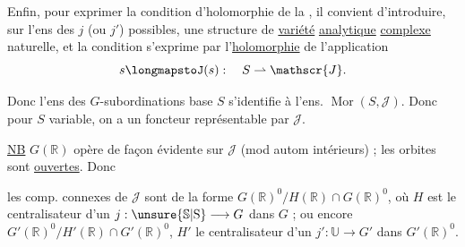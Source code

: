 Enfin, pour exprimer la condition d'holomorphie de la , il convient d'introduire,  sur l'ens  des $j$ (ou $j'$) possibles, une structure de \uline{variété} \uline{analytique} \uline{complexe} naturelle, et la condition s'exprime par l'\uline{holomorphie} de l'application
\[
s\longmapstoJ(s):\quad S\rightharpoonup\mathscr{J}.
\]

 Donc l'ens des $G$-subordinations  base $S$ s'identifie à l'ens. $\operatorname{Mor}(S,\mathscr{J})$. Donc pour $S$ variable, on a un foncteur représentable par $\mathscr{J}$.

\uline{NB} $G(\mathbb{R})$ opère de façon évidente sur $\mathscr{J}$ (mod autom intérieurs) ; les orbites sont \uline{ouvertes}. Donc


les comp. connexes de $\mathscr{J}$ sont de la forme $G(\mathbb{R})^{0}/H(\mathbb{R})\cap G(\mathbb{R})^{0}$, où $H$ est le centralisateur d'un $j:\unsure{\mathbb{S}|\mathrm{S}}\longrightarrow G$ dans $G$ ; ou encore $G'(\mathbb{R})^{0}/H'(\mathbb{R})\cap G'(\mathbb{R})^{0}$, $H'$ le centralisateur d'un $j':\mathbb{U}\longrightarrow G'$ dans $G'(\mathbb{R})^{0}$.

